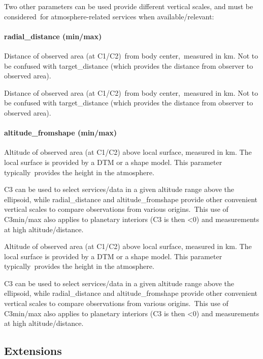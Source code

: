 \documentclass[11pt,a4paper]{ivoa}
\begin{document}
Two other parameters can be used provide different vertical scales, and must be considered for atmosphere-related services when available/relevant: \\

\paragraph{radial\_distance (min/max)}

Distance of observed area (at C1/C2) from body center, measured in km. Not to be confused with target\_distance (which provides the distance from observer to observed area). 

Distance of observed area (at C1/C2) from body center, measured in km. Not to be confused with target\_distance (which provides the distance from observer to observed area). 

\paragraph{altitude\_fromshape (min/max)}

Altitude of observed area (at C1/C2) above local surface, measured in km. The local surface is provided by a DTM or a shape model. This parameter typically provides the height in the atmosphere.

C3 can be used to select services/data in a given altitude range above the ellipsoid, while radial\_distance and altitude\_fromshape provide other convenient vertical scales to compare observations from various origins. This use of C3min/max also applies to planetary interiors (C3 is then <0) and measurements at high altitude/distance. 

Altitude of observed area (at C1/C2) above local surface, measured in km. The local surface is provided by a DTM or a shape model. This parameter typically provides the height in the atmosphere.

C3 can be used to select services/data in a given altitude range above the ellipsoid, while radial\_distance and altitude\_fromshape provide other convenient vertical scales to compare observations from various origins. This use of C3min/max also applies to planetary interiors (C3 is then <0) and measurements at high altitude/distance. 

\subsection{Extensions}
\end{document}
